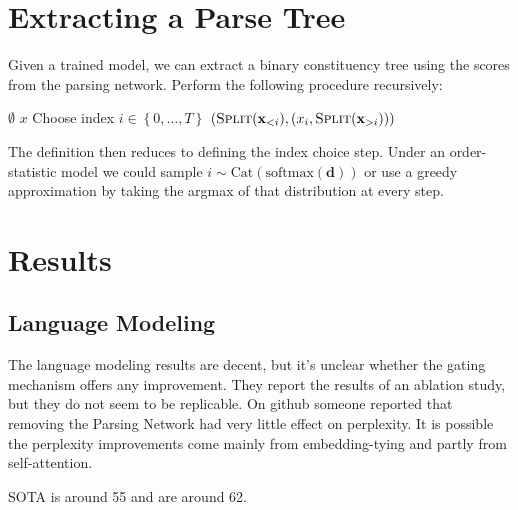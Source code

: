 \documentclass{article}
\newcommand\set[1]{\left\{#1\right\}}
\newcommand{\Cat}{\mathrm{Cat}}
\newcommand{\bd}{\mathbf{d}}
\newcommand{\bx}{\mathbf{x}}
\begin{document}
\section{Extracting a Parse Tree}
Given a trained model, we can extract a binary constituency tree using the scores from the parsing network.
Perform the following procedure recursively:
\begin{algorithmic}
\Function{Split}{$x = \set{x_0,\ldots,x_T}$}
\State \Return $\emptyset$
\State \Return $x$
\Else
\State Choose index $i\in\set{0,\ldots,T}$ 
\State \Return $(\Call{Split}{\bx_{<i}}, (x_i, \Call{Split}{\bx_{>i}}))$
\EndIf
\EndFunction
\end{algorithmic}
The definition then reduces to defining the index choice step.
Under an order-statistic model we could sample $i\sim\Cat(\textrm{softmax}(\bd))$
or use a greedy approximation by taking the argmax of that distribution at every step.

\section{Results}
\subsection{Language Modeling}

The language modeling results are decent, but it's unclear whether the
gating mechanism offers any improvement.
They report the results of an ablation study, but they do not seem to be replicable.
On github someone reported that removing the Parsing Network had very little effect on perplexity.
It is possible the perplexity improvements come 
mainly from embedding-tying and partly from self-attention.

SOTA is around 55 and \citet{shen2018prpn} are around 62.
\end{document}
